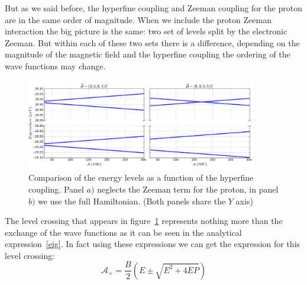 But as we said before, the hyperfine coupling and Zeeman coupling for the proton are in the same order of magnitude. When we include the proton Zeeman interaction the big picture is the same: two set of levels split by the electronic Zeeman. But within each of these two sets there is a difference, depending on the magnitude of the magnetic field and the hyperfine coupling the ordering of the wave functions may change. 
\begin{figure}[h!]
\centering
\includegraphics[width=0.9\textwidth]{chapter03/figures/pro_nopro.png}
\vspace{-5pt}
\renewcommand{\figurename}{\footnotesize{\textsc{Figure}}}
\caption{Comparison of the energy levels as a function of the hyperfine coupling. Panel $a)$ neglects the Zeeman term for the proton, in panel $b)$ we use the full Hamiltonian. (Both panels share the $Y$ axis)}
\label{proton}
\end{figure}
\FloatBarrier
The level crossing that appears in figure~\ref{proton} represents nothing more than the exchange of the wave functions as it can be seen in the analytical expression~\eqref{eig}. In fact using these expressions we can get the expression for this level crossing:
\begin{equation}
  \mathcal{A}_{\times}=\frac{B}{2}\left(E\pm\sqrt{E^2+4EP}\right)
\end{equation}


